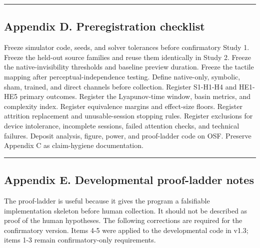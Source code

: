 \documentclass[
  11pt,
]{article}
\begin{document}
\begin{center}\rule{0.5\linewidth}{0.5pt}\end{center}

\subsection{Appendix D. Preregistration
checklist}\label{appendix-d.-preregistration-checklist}

Freeze simulator code, seeds, and solver tolerances
before confirmatory Study 1. Freeze the held-out source
families and reuse them identically in Study 2. Freeze
the native-invisibility thresholds and baseline preview
duration. Freeze the tactile mapping after
perceptual-independence testing. Define native-only,
symbolic, sham, trained, and direct channels before
collection. Register S1-H1-H4 and HE1-HE5 primary
outcomes. Register the Lyapunov-time window, basin
metrics, and complexity index. Register equivalence
margins and effect-size floors. Register attrition
replacement and unusable-session stopping rules.
Register exclusions for device intolerance, incomplete
sessions, failed attention checks, and technical
failures. Deposit analysis, figure, power, and
proof-ladder code on OSF. Preserve Appendix C as
claim-hygiene documentation.

\begin{center}\rule{0.5\linewidth}{0.5pt}\end{center}

\subsection{Appendix E. Developmental proof-ladder
notes}\label{appendix-e.-developmental-proof-ladder-notes}

The proof-ladder is useful because it gives the program
a falsifiable implementation skeleton before human
collection. It should not be described as proof of the
human hypotheses. The following corrections are
required for the confirmatory version. Items 4-5 were
applied to the developmental code in v1.3; items 1-3
remain confirmatory-only requirements.
\end{document}
